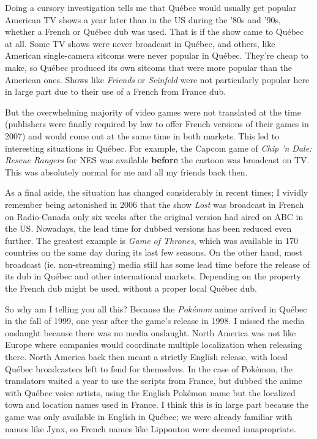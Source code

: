 \documentclass{book}
\begin{document}
Doing a cursory investigation tells me that Québec would usually get popular American TV shows a year later than in the US during the ’80s and ’90s, whether a French or Québec dub was used. That is if the show came to Québec at all. Some TV shows were never broadcast in Québec, and others, like American single-camera sitcoms were never popular in Québec. They’re cheap to make, so Québec produced its own sitcoms that were more popular than the American ones. Shows like \emph{Friends} or \emph{Seinfeld} were not particularly popular here in large part due to their use of a French from France dub.\par
But the overwhelming majority of video games were not translated at the time (publishers were finally required by law to offer French versions of their games in 2007) and would come out at the same time in both markets. This led to interesting situations in Québec. For example, the Capcom game of \emph{Chip ’n Dale: Rescue Rangers} for NES was available \textbf{before} the cartoon was broadcast on TV. This was absolutely normal for me and all my friends back then.\par
As a final aside, the situation has changed considerably in recent times; I vividly remember being astonished in 2006 that the show \emph{Lost} was broadcast in French on Radio-Canada only six weeks after the original version had aired on ABC in the US. Nowadays, the lead time for dubbed versions has been reduced even further. The greatest example is \emph{Game of Thrones}, which was available in 170 countries on the same day during its last few seasons. On the other hand, most broadcast (ie. non-streaming) media still has some lead time before the release of its dub in Québec and other international markets. Depending on the property the French dub might be used, without a proper local Québec dub.\par
So why am I telling you all this? Because the \emph{Pokémon} anime arrived in Québec in the fall of 1999, one year after the game’s release in 1998. I missed the media onslaught because there was no media onslaught. North America was not like Europe where companies would coordinate multiple localization when releasing there. North America back then meant a strictly English release, with local Québec broadcasters left to fend for themselves. In the case of Pokémon, the translators waited a year to use the scripts from France, but dubbed the anime with Québec voice artists, using the English Pokémon name but the localized town and location names used in France. I think this is in large part because the game was only available in English in Québec; we were already familiar with names like Jynx, so French names like Lippoutou were deemed innapropriate.\par
\end{document}
